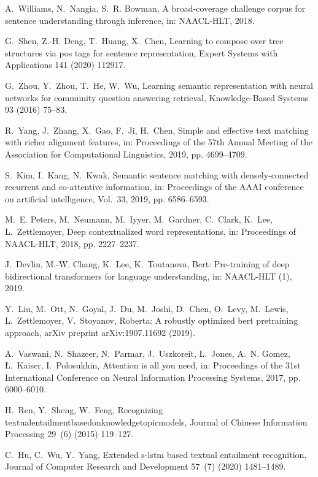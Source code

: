 \documentclass[review]{elsarticle}
\begin{document}
\begin{thebibliography}{10}
A.~Williams, N.~Nangia, S.~R. Bowman, A broad-coverage challenge corpus for
  sentence understanding through inference, in: NAACL-HLT, 2018.

G.~Shen, Z.-H. Deng, T.~Huang, X.~Chen, Learning to compose over tree
  structures via pos tags for sentence representation, Expert Systems with
  Applications 141 (2020) 112917.

G.~Zhou, Y.~Zhou, T.~He, W.~Wu, Learning semantic representation with neural
  networks for community question answering retrieval, Knowledge-Based Systems
  93 (2016) 75--83.

R.~Yang, J.~Zhang, X.~Gao, F.~Ji, H.~Chen, Simple and effective text matching
  with richer alignment features, in: Proceedings of the 57th Annual Meeting of
  the Association for Computational Linguistics, 2019, pp. 4699--4709.

S.~Kim, I.~Kang, N.~Kwak, Semantic sentence matching with densely-connected
  recurrent and co-attentive information, in: Proceedings of the AAAI
  conference on artificial intelligence, Vol.~33, 2019, pp. 6586--6593.

M.~E. Peters, M.~Neumann, M.~Iyyer, M.~Gardner, C.~Clark, K.~Lee,
  L.~Zettlemoyer, Deep contextualized word representations, in: Proceedings of
  NAACL-HLT, 2018, pp. 2227--2237.

J.~Devlin, M.-W. Chang, K.~Lee, K.~Toutanova, Bert: Pre-training of deep
  bidirectional transformers for language understanding, in: NAACL-HLT (1),
  2019.

Y.~Liu, M.~Ott, N.~Goyal, J.~Du, M.~Joshi, D.~Chen, O.~Levy, M.~Lewis,
  L.~Zettlemoyer, V.~Stoyanov, Roberta: A robustly optimized bert pretraining
  approach, arXiv preprint arXiv:1907.11692 (2019).

A.~Vaswani, N.~Shazeer, N.~Parmar, J.~Uszkoreit, L.~Jones, A.~N. Gomez,
  {\L}.~Kaiser, I.~Polosukhin, Attention is all you need, in: Proceedings of
  the 31st International Conference on Neural Information Processing Systems,
  2017, pp. 6000--6010.

H.~Ren, Y.~Sheng, W.~Feng, Recognizing
  textualentailmentbasedonknowledgetopicmodels, Journal of Chinese Information
  Processing 29~(6) (2015) 119--127.

C.~Hu, C.~Wu, Y.~Yang, Extended s-lstm based textual entailment recognition,
  Journal of Computer Research and Development 57~(7) (2020) 1481--1489.


\end{thebibliography}
\end{document}
